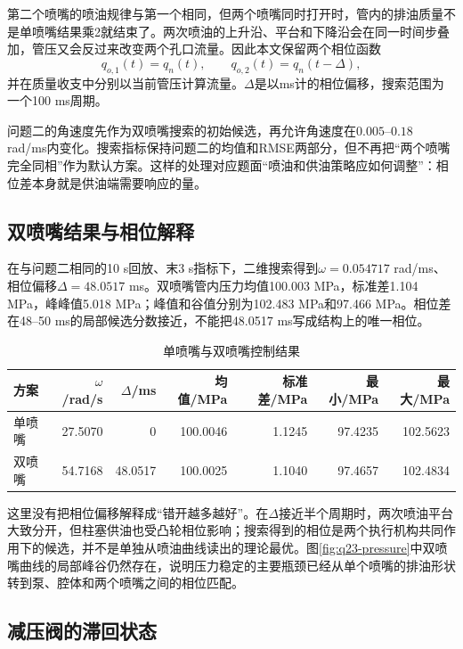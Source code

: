 \documentclass[UTF8,11pt,a4paper]{ctexart}
\begin{document}
第二个喷嘴的喷油规律与第一个相同，但两个喷嘴同时打开时，管内的排油质量不是单喷嘴结果乘2就结束了。两次喷油的上升沿、平台和下降沿会在同一时间步叠加，管压又会反过来改变两个孔口流量。因此本文保留两个相位函数
\begin{equation}
q_{o,1}(t)=q_n(t),\qquad q_{o,2}(t)=q_n(t-\Delta),
\end{equation}
并在质量收支中分别以当前管压计算流量。$\Delta$是以ms计的相位偏移，搜索范围为一个100 ms周期。

问题二的角速度先作为双喷嘴搜索的初始候选，再允许角速度在$0.005$--$0.18$ rad/ms内变化。搜索指标保持问题二的均值和RMSE两部分，但不再把“两个喷嘴完全同相”作为默认方案。这样的处理对应题面“喷油和供油策略应如何调整”：相位差本身就是供油端需要响应的量。

\subsection{双喷嘴结果与相位解释}

在与问题二相同的10 s回放、末3 s指标下，二维搜索得到$\omega=0.054717$ rad/ms、相位偏移$\Delta=48.0517$ ms。双喷嘴管内压力均值100.003 MPa，标准差1.104 MPa，峰峰值5.018 MPa；峰值和谷值分别为102.483 MPa和97.466 MPa。相位差在48--50 ms的局部候选分数接近，不能把48.0517 ms写成结构上的唯一相位。

\begin{table}[H]
\centering
\caption{单喷嘴与双喷嘴控制结果}
\label{tab:q3-two-nozzles}
\small
\begin{tabular}{lrrrrrr}
\toprule
方案 & $\omega$/rad/s & $\Delta$/ms & 均值/MPa & 标准差/MPa & 最小/MPa & 最大/MPa\\
\midrule
单喷嘴 & 27.5070 & 0 & 100.0046 & 1.1245 & 97.4235 & 102.5623\\
双喷嘴 & 54.7168 & 48.0517 & 100.0025 & 1.1040 & 97.4657 & 102.4834\\
\bottomrule
\end{tabular}
\end{table}

这里没有把相位偏移解释成“错开越多越好”。在$\Delta$接近半个周期时，两次喷油平台大致分开，但柱塞供油也受凸轮相位影响；搜索得到的相位是两个执行机构共同作用下的候选，并不是单独从喷油曲线读出的理论最优。图\ref{fig:q23-pressure}中双喷嘴曲线的局部峰谷仍然存在，说明压力稳定的主要瓶颈已经从单个喷嘴的排油形状转到泵、腔体和两个喷嘴之间的相位匹配。

\subsection{减压阀的滞回状态}
\end{document}

